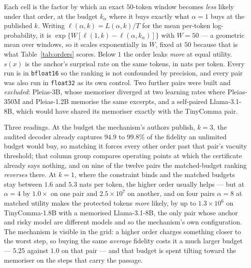 Each cell is the factor by which an exact $50$-token window becomes \emph{less} likely under that
order, at the budget $k_\alpha$ where it buys exactly what $\alpha{=}1$ buys at the published $k$.
Writing $\ell(\alpha,k) = L(\alpha,k)/T$ for the mean per-token log-probability, it is
$\exp\{W[\ell(1,k) - \ell(\alpha,k_\alpha)]\}$ with $W = 50$ --- a geometric mean over windows, so it
scales exponentially in $W$, fixed at $50$ because that is what Table~\ref{tab:orders} scores. Below
$1$ the order leaks \emph{more} at equal utility. $s(x)$ is the anchor's surprisal rate on the same tokens, in nats per token. Every run is in
\texttt{bfloat16} so the ranking is not confounded by precision, and every pair was also run in
\texttt{float32} as its own control. Two further pairs were built and \emph{excluded}: Pleias-3B,
whose memoriser diverged at two learning rates where Pleias-350M and Pleias-1.2B memorise the same
excerpts, and a self-paired Llama-3.1-8B, which would have shared its memoriser exactly with the
TinyComma pair.

Three readings. At the budget the mechanism's authors publish, $k=3$, the audited decoder already
captures $94.9$ to $99.8\%$ of the fidelity an unlimited budget would buy, so matching it forces
every other order past that pair's vacuity threshold; that column group compares operating points at
which the certificate already says nothing, and on nine of the twelve pairs the matched-budget
ranking \emph{reverses} there. At $k=1$, where the constraint binds and the matched budgets stay
between $1.6$ and $5.3$ nats per token, the higher order usually helps --- but at $\alpha{=}4$ by
$1.0\times$ on one pair and $2.5\times10^{7}$ on another, and on four pairs $\alpha{=}8$ at matched
utility makes the protected tokens \emph{more} likely, by up to $1.3\times10^{6}$ on TinyComma-1.8B
with a memorised Llama-3.1-8B, the only pair whose anchor and risky model are different models and so
the mechanism's own configuration. The mechanism is visible in the grid: a higher order charges
something closer to the worst step, so buying the same \emph{average} fidelity costs it a much larger
budget --- $5.25$ against $1.0$ on that pair --- and that budget is spent tilting toward the
memoriser on the steps that carry the passage.

